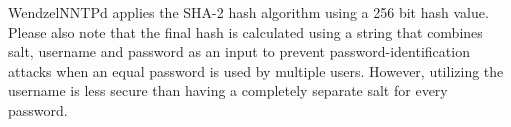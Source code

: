WendzelNNTPd applies the SHA-2 hash algorithm using a 256 bit hash value. Please also note that the final hash is calculated using a string that combines salt, username and password as an input to prevent password-identification attacks when an equal password is used by multiple users. However, utilizing the username is less secure than having a completely separate salt for every password.



